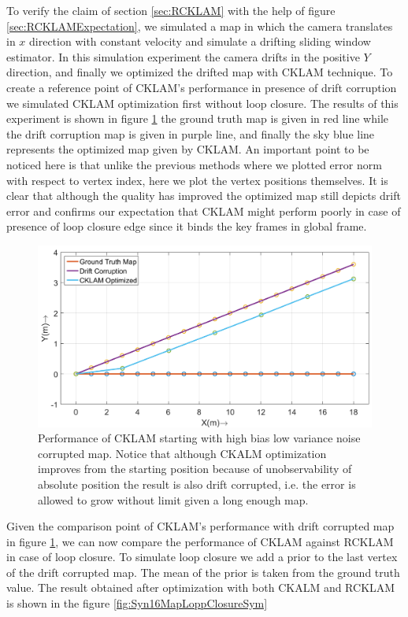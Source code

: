   To verify the claim of section \ref{sec:RCKLAM} with the help of figure \ref{sec:RCKLAMExpectation}, we simulated a map in which the camera translates in $x$ direction with constant velocity and simulate a drifting sliding window estimator. In this simulation experiment the camera drifts in the positive $Y$ direction, and finally we optimized the drifted map with CKLAM technique. To create a reference point of CKLAM's performance in presence of drift corruption we simulated CKLAM optimization first without loop closure. The results of this experiment is shown in figure \ref{fig:Syn16MapCklam} the ground truth map is given in red line while the drift corruption map is given in purple line, and finally the sky blue line represents the optimized map given by CKLAM. An important point to be noticed here is that unlike the previous methods where we plotted error norm with respect to vertex index, here we plot the vertex positions themselves. It is clear that although the quality has improved the optimized map still depicts drift error and confirms our expectation that CKLAM might perform poorly in case of presence of loop closure edge since it binds the key frames in global frame.
  
\begin{figure}
  \centering
    \includegraphics[width=1.00\textwidth]{images/Syn16_map_cklam.png}
  \caption{Performance of CKLAM starting with high bias low variance noise corrupted map. Notice that although CKALM optimization improves from the starting position because of unobservability of absolute position the result is also drift corrupted, i.e. the error is allowed to grow without limit given a long enough map.}
  \label{fig:Syn16MapCklam}
\end{figure}
  
  Given the comparison point of CKLAM's performance with drift corrupted map in figure \ref{fig:Syn16MapCklam}, we can now compare the performance of CKLAM against RCKLAM in case of loop closure. To simulate loop closure we add a prior to the last vertex of the drift corrupted map. The mean of the prior is taken from the ground truth value. The result obtained after optimization with both CKALM and RCKLAM is shown in the figure \ref{fig:Syn16MapLoppClosureSym}
  
